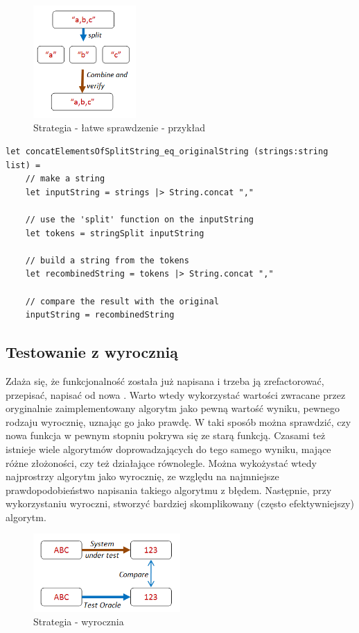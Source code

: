 \begin{figure}
    \centering
    \includegraphics[width=0.35\textwidth]{images/property_string_split.png}
    \caption{Strategia - łatwe sprawdzenie - przykład }
    \label{fig:easy_verification_strategy_example}
\end{figure}

\lstset{language=FSharp, basicstyle=\scriptsize}
\begin{lstlisting}[frame=single,caption={Test string split},label=kod:list_string_split]
let concatElementsOfSplitString_eq_originalString (strings:string list) =
    // make a string
    let inputString = strings |> String.concat ","
    
    // use the 'split' function on the inputString
    let tokens = stringSplit inputString
    
    // build a string from the tokens
    let recombinedString = tokens |> String.concat ","
    
    // compare the result with the original
    inputString = recombinedString
\end{lstlisting}

\subsection{Testowanie z wyrocznią}

Zdaża się, że funkcjonalność została już napisana i trzeba ją zrefactorować, przepisać, napisać od nowa . Warto wtedy wykorzystać wartości zwracane przez oryginalnie zaimplementowany algorytm jako pewną wartość wyniku, pewnego rodzaju wyrocznię, uznając go jako prawdę. 
W taki sposób można sprawdzić, czy nowa funkcja w pewnym stopniu pokrywa się ze starą funkcją. Czasami też istnieje wiele algorytmów doprowadzających do tego samego wyniku, mające różne złożoności, czy też działające równolegle. 
Można wykożystać wtedy najprostrzy algorytm jako wyrocznię, ze względu na najmniejsze prawdopodobieństwo napisania takiego algorytmu z błędem. Następnie, przy wykorzystaniu wyroczni, stworzyć bardziej skomplikowany (często efektywniejszy) algorytm.

\begin{figure}
    \centering
    \includegraphics[width=0.5\textwidth]{images/property_test_oracle.png}
    \caption{Strategia - wyrocznia}
    \label{fig:oracle_strategy}
\end{figure}


